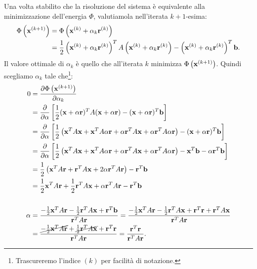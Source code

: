 
Una volta stabilito che la risoluzione del sistema è equivalente alla minimizzazione dell'energia $\Phi$, valutiamola nell'iterata $k+1$-esima:
\begin{align*}
\Phi \left(\mathbf{x}^{( k+1)}\right) & =\Phi \left(\mathbf{x}^{(k)} +\alpha _{k}\mathbf{r}^{(k)}\right)\\
 & =\frac{1}{2}\left(\mathbf{x}^{(k)} +\alpha _{k}\mathbf{r}^{(k)}\right)^{T} A\left(\mathbf{x}^{(k)} +\alpha _{k}\mathbf{r}^{(k)}\right) -\left(\mathbf{x}^{(k)} +\alpha _{k}\mathbf{r}^{(k)}\right)^{T}\mathbf{b}.
\end{align*}
Il valore ottimale di $\alpha _{k}$ è quello che all'iterata $k$ minimizza $\Phi \left(\mathbf{x}^{( k+1)}\right)$. Quindi scegliamo $\alpha _{k}$ tale che\footnote{Trascureremo l'indice $( k)$ per facilità di notazione.}:
\begin{align*}
0 & =\frac{\partial \Phi \left(\mathbf{x}^{( k+1)}\right)}{\partial \alpha _{k}}\\
 & =\frac{\partial }{\partial \alpha }\left[\frac{1}{2}(\mathbf{x} +\alpha \mathbf{r})^{T} A(\mathbf{x} +\alpha \mathbf{r}) -(\mathbf{x} +\alpha \mathbf{r})^{T}\mathbf{b}\right]\\
 & =\frac{\partial }{\partial \alpha }\left[\frac{1}{2}\left(\mathbf{x}^{T} A\mathbf{x} +\mathbf{x}^{T} A\alpha \mathbf{r} +\alpha \mathbf{r}^{T} A\mathbf{x} +\alpha \mathbf{r}^{T} A\alpha \mathbf{r}\right) -(\mathbf{x} +\alpha \mathbf{r})^{T}\mathbf{b}\right]\\
 & =\frac{\partial }{\partial \alpha }\left[\frac{1}{2}\left(\mathbf{x}^{T} A\mathbf{x} +\mathbf{x}^{T} A\alpha \mathbf{r} +\alpha \mathbf{r}^{T} A\mathbf{x} +\alpha \mathbf{r}^{T} A\alpha \mathbf{r}\right) -\mathbf{x}^{T}\mathbf{b} -\alpha \mathbf{r}^{T}\mathbf{b}\right]\\
 & =\frac{1}{2}\left(\mathbf{x}^{T} A\mathbf{r} +\mathbf{r}^{T} A\mathbf{x} +2\alpha \mathbf{r}^{T} A\mathbf{r}\right) -\mathbf{r}^{T}\mathbf{b}\\
 & =\frac{1}{2}\mathbf{x}^{T} A\mathbf{r} +\frac{1}{2}\mathbf{r}^{T} A\mathbf{x} +\alpha \mathbf{r}^{T} A\mathbf{r} -\mathbf{r}^{T}\mathbf{b}\\
 & \\
\alpha  & =\frac{-\frac{1}{2}\mathbf{x}^{T} A\mathbf{r} -\frac{1}{2}\mathbf{r}^{T} A\mathbf{x} +\mathbf{r}^{T}\mathbf{b}}{\mathbf{r}^{T} A\mathbf{r}} =\frac{-\frac{1}{2}\mathbf{x}^{T} A\mathbf{r} -\frac{1}{2}\mathbf{r}^{T} A\mathbf{x} +\mathbf{r}^{T}\mathbf{r} +\mathbf{r}^{T} A\mathbf{x}}{\mathbf{r}^{T} A\mathbf{r}}\\
 & =\frac{\cancel{-\frac{1}{2}\mathbf{x}^{T} A\mathbf{r}} +\cancel{\frac{1}{2}\mathbf{r}^{T} A\mathbf{x}} +\mathbf{r}^{T}\mathbf{r}}{\mathbf{r}^{T} A\mathbf{r}} =\frac{\mathbf{r}^{T}\mathbf{r}}{\mathbf{r}^{T} A\mathbf{r}}.
\end{align*}
